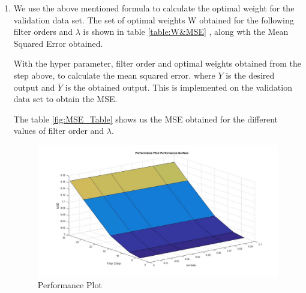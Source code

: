 \documentclass[10pt, letterpaper]{article}
\begin{document}
\begin{enumerate}
\item  We use the above mentioned formula to calculate the optimal weight for the validation data set. The set of optimal weights W obtained for the following filter orders and  $\lambda$ is shown in table \ref{table:W&MSE} , along wth the Mean Squared Error obtained.

With the hyper parameter, filter order and optimal weights obtained from the step above,
to calculate the mean squared error. where $Y$ is the desired output and $\overline{Y}$ is the obtained output. This is implemented on the validation data set to obtain the MSE.

The table \ref{fig:MSE_Table} shows us the MSE obtained for the different values of filter order and $\lambda$.



\begin{figure}
\centering
\label{fig:PerformancePlot}
\caption{Performance Plot}
\includegraphics[scale=0.25]{PerformancePlot}
\end{figure}


\end{enumerate}
\end{document}
